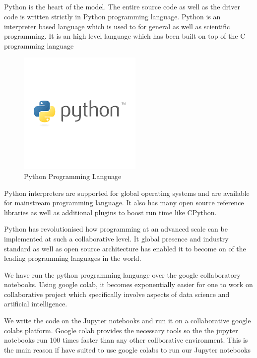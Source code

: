\documentclass[12pt]{article}
\newcommand{\nd}{\noindent}
\newcommand{\subsize}{\fontsize{14pt}{12pt}\selectfont}
\begin{document}
\newpage
\subsection{\textbf{\subsize{ENVIRONEMNT SETUP}}}

\nd Python is the heart of the model. The entire source code as well as the driver code is written strictly in Python programming language. Python is an interpreter based language which is used to for general as well as scientific programming. It is an high level language which has been built on top of the C programming language 

\begin{center}
\begin{figure}[h]
\centerline{\includegraphics[scale=.75]{python.png}}
\caption{Python Programming Language}
\end{figure}
\end{center}

\nd Python interpreters are supported for global operating systems and are available for mainstream programming language. It also has many open source reference libraries as well as additional plugins to boost run time like CPython. 

\nd Python has revolutionised how programming at an advanced scale can be implemented at such a collaborative level. It global presence and industry standard as well as open source architecture has enabled it to become on of the leading programming languages in the world. 

\nd We have run the python programming language over the google collaboratory notebooks. Using google colab, it becomes exponentially easier for one to work on collaborative project which specifically involve aspects of data science and artificial intelligence. 

\newpage
\nd We write the code on the Jupyter notebooks and run it on a collaborative google colabs platform. Google colab provides the necessary tools so the the jupyter notebooks run 100 times faster than any other collborative environment. This is the main reason if have suited to use google colabs to run our Jupyter notebooks 
\end{document}
